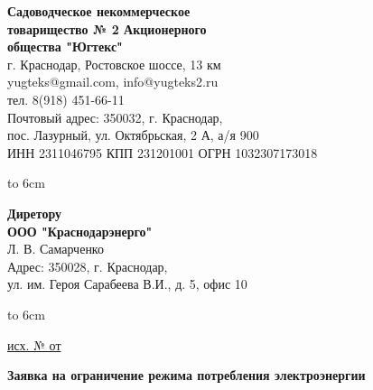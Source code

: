 \noindent\parbox[l][71mm]{80mm}
{
	\begin{center}
		{\small \textbf{Садоводческое некоммерческое\\ товарищество
				№  2 Акционерного\\ общества "Югтекс"\\
		}}
		\footnotesize{г. Краснодар, Ростовское шоссе, 13 км\\
			yugteks@gmail.com, info@yugteks2.ru\\
			тел. 8(918) 451-66-11\\
			Почтовый адрес: 350032, г. Краснодар,\\ пос. Лазурный, ул. Октябрьская, 2 А, а/я   900
		}\\
		{ИНН 2311046795 КПП 231201001 ОГРН 1032307173018}
	\end{center}
	\hbox to 6cm{ }}\hfill
\parbox[l][71mm]{65mm}
{ \begin{center}
		\small{
			\textbf{Диретору\\ ООО "Краснодарэнерго"}\\
			\vspace{3mm}
			Л. В. Самарченко\\
			\vspace{3mm}
			{\footnotesize Адрес: 350028, г. Краснодар,\\ ул. им. Героя Сарабеева В.И., д. 5, офис 10}
			
		}
	\end{center}
	\hbox to 6cm{ }}
\linebreak
\vspace{-12mm}

\underline{исх. №   от  } 

\vspace{8mm}
\begin{center}
	\Large\textbf{Заявка на ограничение режима потребления электроэнергии}
\end{center}
\par
\vspace{10mm}



